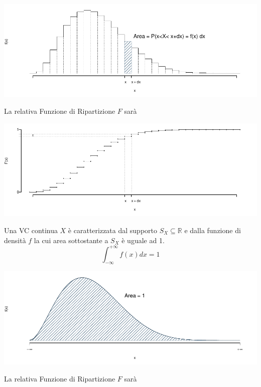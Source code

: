 \documentclass[
  11pt,
]{book}
\theoremstyle{mytheoremstyle}
\theoremstyle{mydefstyle}
\begin{document}
\begin{center}\includegraphics{Appunti_di_Statistica_2025_files/figure-latex/06-Variabili-Casuali-10-1} \end{center}

La relativa Funzione di Ripartizione \(F\) sarà

\begin{center}\includegraphics{Appunti_di_Statistica_2025_files/figure-latex/06-Variabili-Casuali-11-1} \end{center}

Una VC continua \(X\) è caratterizzata dal supporto \(S_X\subseteq\mathbb{R}\) e dalla
funzione di densità \(f\) la cui area sottostante a \(S_X\) è uguale ad 1.
\[\int_{-\infty}^{+\infty}f(x)dx=1\]

\begin{center}\includegraphics{Appunti_di_Statistica_2025_files/figure-latex/06-Variabili-Casuali-12-1} \end{center}

La relativa Funzione di Ripartizione \(F\) sarà
\end{document}
